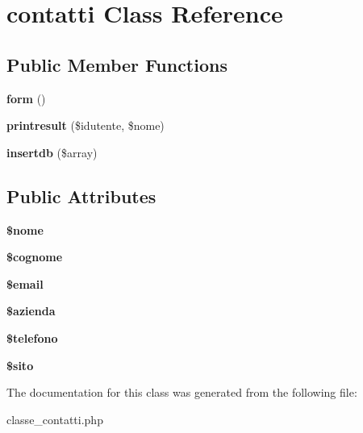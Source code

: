 \hypertarget{classcontatti}{\section{contatti Class Reference}
\label{classcontatti}
}
\subsection*{Public Member Functions}
\begin{DoxyCompactItemize}
\item 
\hypertarget{classcontatti_aef9fb10cff0faca65cf0248d1dc1ab40}{{\bfseries form} ()}\label{classcontatti_aef9fb10cff0faca65cf0248d1dc1ab40}

\item 
\hypertarget{classcontatti_a0c6d59776537fa3b012de29598c16aaf}{{\bfseries printresult} (\$idutente, \$nome)}\label{classcontatti_a0c6d59776537fa3b012de29598c16aaf}

\item 
\hypertarget{classcontatti_a08d37164c95065562c8410b78b545b9b}{{\bfseries insertdb} (\$array)}\label{classcontatti_a08d37164c95065562c8410b78b545b9b}

\end{DoxyCompactItemize}
\subsection*{Public Attributes}
\begin{DoxyCompactItemize}
\item 
\hypertarget{classcontatti_a4912b8fe69e364789075e969b6ccd864}{{\bfseries \$nome}}\label{classcontatti_a4912b8fe69e364789075e969b6ccd864}

\item 
\hypertarget{classcontatti_abd20c88db42d3e1149f4dd6dd492a137}{{\bfseries \$cognome}}\label{classcontatti_abd20c88db42d3e1149f4dd6dd492a137}

\item 
\hypertarget{classcontatti_a650b9646643b6706b9ad503b438e6b67}{{\bfseries \$email}}\label{classcontatti_a650b9646643b6706b9ad503b438e6b67}

\item 
\hypertarget{classcontatti_a6f94f33d443f8b9a968c59231fdcf37c}{{\bfseries \$azienda}}\label{classcontatti_a6f94f33d443f8b9a968c59231fdcf37c}

\item 
\hypertarget{classcontatti_af8698d8c484a22cf60032759292838fb}{{\bfseries \$telefono}}\label{classcontatti_af8698d8c484a22cf60032759292838fb}

\item 
\hypertarget{classcontatti_af73bf911a1a67130c59135098e751e57}{{\bfseries \$sito}}\label{classcontatti_af73bf911a1a67130c59135098e751e57}

\end{DoxyCompactItemize}


The documentation for this class was generated from the following file\-:\begin{DoxyCompactItemize}
\item 
classe\-\_\-contatti.\-php\end{DoxyCompactItemize}
